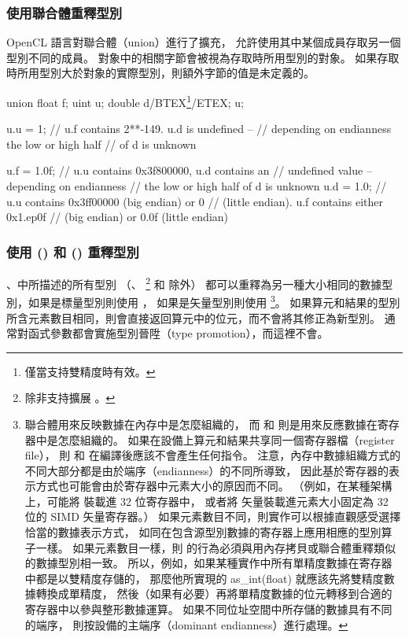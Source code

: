 \subsubsection{使用聯合體重釋型別}

OpenCL 語言對聯合體（union）進行了擴充，
允許使用其中某個成員存取另一個型別不同的成員。
對象中的相關字節會被視為存取時所用型別的對象。
如果存取時所用型別大於對象的實際型別，則額外字節的值是未定義的。

\startexample
\startclc
union{ float f; uint u; double d/BTEX\footnote{僅當支持雙精度時有效。}/ETEX;} u;

u.u = 1;	// u.f contains 2**-149. u.d is undefined --
		// depending on endianness the low or high half
		// of d is unknown

u.f = 1.0f;	// u.u contains 0x3f800000, u.d contains an
		// undefined value -- depending on endianness
		// the low or high half of d is unknown
u.d = 1.0;	// u.u contains 0x3ff00000 (big endian) or 0
		// (little endian). u.f contains either 0x1.ep0f
		// (big endian) or 0.0f (little endian)
\stopclc
\stopexample

\subsubsection[sec:as_typen]{使用 () 和 () 重釋型別}

、中所描述的所有型別
（、 
\footnote{除非支持擴展 。} 和  除外）
都可以重釋為另一種大小相同的數據型別，如果是標量型別則使用 ，
如果是矢量型別則使用 \footnote{
聯合體用來反映數據在內存中是怎麼組織的，
而  和  則是用來反應數據在寄存器中是怎麼組織的。
如果在設備上算元和結果共享同一個寄存器檔（register file），
則  和  在編譯後應該不會產生任何指令。
注意，內存中數據組織方式的不同大部分都是由於端序（endianness）的不同所導致，
因此基於寄存器的表示方式也可能會由於寄存器中元素大小的原因而不同。
（例如，在某種架構上，可能將  裝載進 32 位寄存器中，
或者將  矢量裝載進元素大小固定為 32 位的 SIMD 矢量寄存器。）
如果元素數目不同，則實作可以根據直觀感受選擇恰當的數據表示方式，
如同在包含源型別數據的寄存器上應用相應的型別算子一樣。
如果元素數目一樣，則  的行為必須與用內存拷貝或聯合體重釋類似的數據型別相一致。
所以，例如，如果某種實作中所有單精度數據在寄存器中都是以雙精度存儲的，
那麼他所實現的 as_int(float) 就應該先將雙精度數據轉換成單精度，
然後（如果有必要）再將單精度數據的位元轉移到合適的寄存器中以參與整形數據運算。
如果不同位址空間中所存儲的數據具有不同的端序，
則按設備的主端序（dominant endianness）進行處理。
}。
如果算元和結果的型別所含元素數目相同，則會直接返回算元中的位元，而不會將其修正為新型別。
通常對函式參數都會實施型別晉陞（type promotion），而這裡不會。

